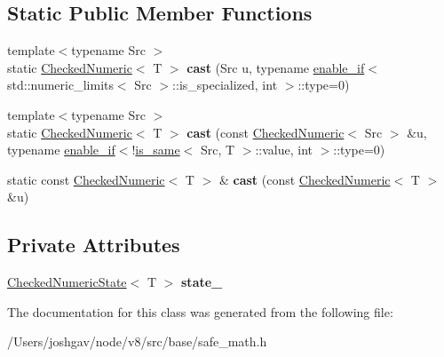 \subsection*{Static Public Member Functions}
\begin{DoxyCompactItemize}
\item 
{\footnotesize template$<$typename Src $>$ }\\static \hyperlink{classv8_1_1base_1_1internal_1_1_checked_numeric}{Checked\+Numeric}$<$ T $>$ {\bfseries cast} (Src u, typename \hyperlink{structv8_1_1base_1_1internal_1_1enable__if}{enable\+\_\+if}$<$ std\+::numeric\+\_\+limits$<$ Src $>$\+::is\+\_\+specialized, int $>$\+::type=0)\hypertarget{classv8_1_1base_1_1internal_1_1_checked_numeric_a3aa54c4ca2d087a313ad7ca35adbe0f9}{}\label{classv8_1_1base_1_1internal_1_1_checked_numeric_a3aa54c4ca2d087a313ad7ca35adbe0f9}

\item 
{\footnotesize template$<$typename Src $>$ }\\static \hyperlink{classv8_1_1base_1_1internal_1_1_checked_numeric}{Checked\+Numeric}$<$ T $>$ {\bfseries cast} (const \hyperlink{classv8_1_1base_1_1internal_1_1_checked_numeric}{Checked\+Numeric}$<$ Src $>$ \&u, typename \hyperlink{structv8_1_1base_1_1internal_1_1enable__if}{enable\+\_\+if}$<$!\hyperlink{structv8_1_1base_1_1internal_1_1is__same}{is\+\_\+same}$<$ Src, T $>$\+::value, int $>$\+::type=0)\hypertarget{classv8_1_1base_1_1internal_1_1_checked_numeric_a22783d28fd6d369881fcfd5ea0c81051}{}\label{classv8_1_1base_1_1internal_1_1_checked_numeric_a22783d28fd6d369881fcfd5ea0c81051}

\item 
static const \hyperlink{classv8_1_1base_1_1internal_1_1_checked_numeric}{Checked\+Numeric}$<$ T $>$ \& {\bfseries cast} (const \hyperlink{classv8_1_1base_1_1internal_1_1_checked_numeric}{Checked\+Numeric}$<$ T $>$ \&u)\hypertarget{classv8_1_1base_1_1internal_1_1_checked_numeric_aac2033a3fb2b3c6f6709285b375fa102}{}\label{classv8_1_1base_1_1internal_1_1_checked_numeric_aac2033a3fb2b3c6f6709285b375fa102}

\end{DoxyCompactItemize}
\subsection*{Private Attributes}
\begin{DoxyCompactItemize}
\item 
\hyperlink{classv8_1_1base_1_1internal_1_1_checked_numeric_state}{Checked\+Numeric\+State}$<$ T $>$ {\bfseries state\+\_\+}\hypertarget{classv8_1_1base_1_1internal_1_1_checked_numeric_ac8509b05a46f119f1add0f54059134ca}{}\label{classv8_1_1base_1_1internal_1_1_checked_numeric_ac8509b05a46f119f1add0f54059134ca}

\end{DoxyCompactItemize}


The documentation for this class was generated from the following file\+:\begin{DoxyCompactItemize}
\item 
/\+Users/joshgav/node/v8/src/base/safe\+\_\+math.\+h\end{DoxyCompactItemize}

